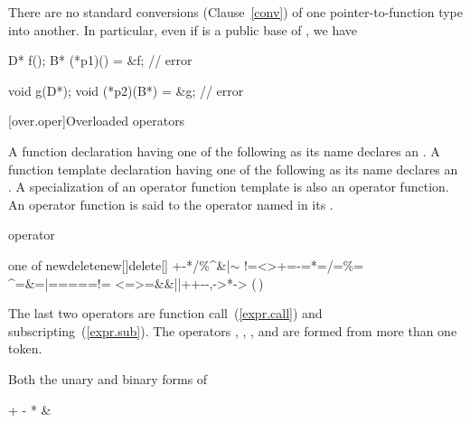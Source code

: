 \pnum
{}%
\enternote
There are no standard conversions (Clause~\ref{conv}) of one
pointer-to-function type into another.
In particular, even if
is a public base of
,
we have

\begin{codeblock}
D* f();
B* (*p1)() = &f;                // error

void g(D*);
void (*p2)(B*) = &g;            // error
\end{codeblock}
\exitnote

[over.oper]{Overloaded operators}%
%
%

\pnum
{}%
%
A function declaration having one of the following
as its name declares an
.
A function template declaration having one of the
following  as its name
declares an . A specialization
of an operator function template is also an operator function.
An operator function is said to
the operator named in its
.

\begin{bnf}
\br
     operator
\end{bnf}

\begin{bnfkeywordtab}
 \textnormal{one of}\br
\>new\>delete\>new[]\>delete[]\br
\>+\>-\>*\>/\>\%\>\^{}\>\&\>|\>$\sim$\br
\>!\>=\><\>>\>+=\>-=\>*=\>/=\>\%=\br
\>\^{}=\>\&=\>|=\>\shl\>\shr\>\shr=\>\shl=\>={=}\>!=\br
\><=\>>=\>\&\&\>|{|}\>++\>-{-}\>,\>->*\>->\br
\>(\,)\>[\,]
\end{bnfkeywordtab}

\enternote
The last two operators are function call~(\ref{expr.call})
and subscripting~(\ref{expr.sub}).
The operators
,
,
\tcode{()},
and
\tcode{[]}
are formed from more than one token.
\exitnote
{}%
%

\pnum
Both the unary and binary forms of

\begin{codeblock}
+    -    *     &
\end{codeblock}

